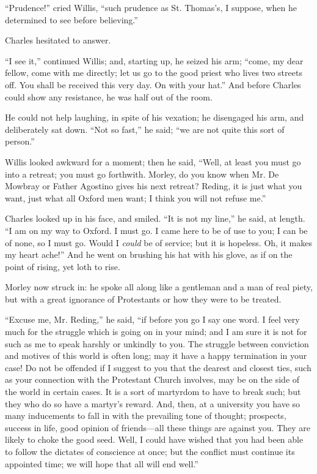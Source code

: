 ``Prudence!'' cried Willis, ``such prudence as St.
Thomas's, I suppose, when he determined to see before believing.''

Charles hesitated to answer.

``I see it,'' continued Willis; and, starting up, he seized
his arm; ``come, my dear fellow, come with me directly; let us go
to the good priest who lives two streets off. You shall be received
this very day. On with your hat.'' And before Charles could show
any resistance, he was half out of the room.

He could not help laughing, in spite of his vexation; he disengaged
his arm, and deliberately sat down. ``Not so fast,'' he said;
``we are not quite this sort of person.''

Willis looked awkward for a moment; then he said, ``Well, at
least you must go into a retreat; you must go forthwith. Morley, do
you know when Mr. De Mowbray or Father Agostino gives his next
retreat? Reding, it is just what you want, just what all Oxford men want; I
think you will not refuse me.''

Charles looked up in his face, and smiled. ``It is not my line,'' he said, at length. ``I am on my way to Oxford. I must
go. I came here to be of use to you; I can be of none, so I must go.
Would I \emph{could} be of service; but it is hopeless. Oh, it makes
my heart ache!'' And he went on brushing his hat with his glove,
as if on the point of rising, yet loth to rise.

Morley now struck in: he spoke all along like a gentleman and a man
of real piety, but with a great ignorance of Protestants or how they
were to be treated.

``Excuse me, Mr. Reding,'' he said, ``if before you go
I say one word. I feel very much for the struggle which is going on in
your mind; and I am sure it is not for such as me to speak harshly or
unkindly to you. The struggle between conviction and motives of this
world is often long; may it have a happy termination in your case! Do
not be offended if I suggest to you that the dearest and closest ties,
such as your connection with the Protestant Church involves, may be on
the side of the world in certain cases. It is a sort of martyrdom to
have to break such; but they who do so have a martyr's reward. And,
then, at a university you have so many inducements to fall in with
the prevailing tone of thought; prospects, success in life, good
opinion of friends—all these things are against you. They are likely
to choke the good seed. Well, I could have wished that you had been
able to follow the dictates of conscience at once; but the conflict
must continue its appointed time; we will hope that all will end
well.''

